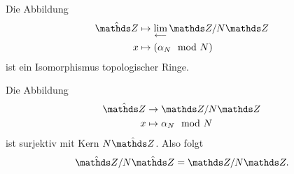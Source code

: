 \begin{thm}
Die Abbildung
\begin{align*}
\hat{\Z}&\mapsto \lim_{\longleftarrow} \Z /N \Z\\
x&\mapsto (\alpha_N \mod N)
\end{align*}
ist ein Isomorphismus topologischer Ringe.
\end{thm}

Die Abbildung
\begin{align*}
\hat{\Z} &\to \Z /N\Z\\
x&\mapsto \alpha_N \mod N
\end{align*}
ist surjektiv mit Kern $N\hat{\Z}$. Also folgt
\begin{align*}
\hat{\Z}/N\hat{\Z}=\Z /N \Z.
\end{align*}